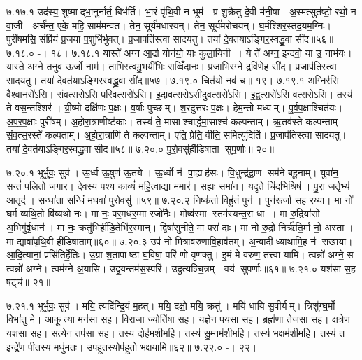 ७.१७.१
उद॑स्य॒ शुष्माद्भा॒नुर्नार्त॒ बिभ॑र्ति। भा॒रं पृ॑थि॒वी न भूम॑। प्र शु॒क्रैतु॑ दे॒वी म॑नी॒षा। अ॒स्मत्सुत॑ष्टो॒ रथो॒ न वा॒जी। अर्च॑न्त॒ एके॒ महि॒ साम॑मन्वत। तेन॒ सूर्य॑मधारयन्। तेन॒ सूर्य॑मरोचयन्। घ॒र्मश्शिर॒स्तद॒यम॒ग्निः। पुरी॑षमसि॒ संप्रि॑यं प्र॒जया॑ प॒शुभि॑र्भुवत्। प्र॒जापति॑स्त्वा सादयतु। तया॑ दे॒वत॑याऽङ्गिर॒स्वद्ध्रु॒वा सी॑द॥५६॥
७.१८.०
-। १८।
\anuvakamend
७.१८.१
यास्ते॑ अग्न आ॒र्द्रा योन॑यो॒ याः कु॑ला॒यिनी। ये ते॑ अग्न॒ इन्द॑वो॒ या उ॒ नाभ॑यः। यास्ते॑ अग्ने त॒नुव॒ ऊर्जो॒ नाम॑। ताभि॒स्त्वमु॒भयी॑भिः सव्विँदा॒नः। प्र॒जाभि॑रग्ने॒ द्रवि॑णे॒ह सी॑द। प्र॒जाप॑तिस्त्वा सादयतु। तया॑ दे॒वत॑याऽङ्गिर॒स्वद्ध्रु॒वा सी॑द॥५७॥
७.१९.०
चित॑यो॒ नव॑ च॥ १९।
\anuvakamend
७.१९.१
अ॒ग्निर॑सि वैश्वान॒रो॑ऽसि। सं॒व॒त्स॒रो॑ऽसि परिवत्स॒रो॑ऽसि। इ॒दा॒व॒त्स॒रो॑ऽसीदुवत्स॒रो॑ऽसि। इ॒द्व॒त्स॒रो॑ऽसि वत्स॒रो॑ऽसि। तस्य॑ ते वस॒न्तश्शिर॑। ग्री॒ष्मो दक्षि॑णः प॒क्षः। व॒र्\mbox{}षाः पुच्छम्। श॒रदुत्त॑रः प॒क्षः। हे॒म॒न्तो मध्यम्। पू॒र्व॒प॒क्षाश्चित॑यः। अ॒प॒र॒प॒क्षाः पुरी॑षम्। अ॒हो॒रा॒त्राणीष्ट॑काः। तस्य॑ ते॒ मासाश्चार्द्धमा॒साश्च॑ कल्पन्ताम्। ऋ॒तव॑स्ते कल्पन्ताम्। सं॒व॒त्स॒रस्ते॑ कल्पताम्। अ॒हो॒रा॒त्राणि॑ ते कल्पन्ताम्। एति॒ प्रेति॒ वीति॒ समित्युदिति॑। प्र॒जाप॑तिस्त्वा सादयतु। तया॑ दे॒वत॑याऽङ्गिर॒स्वद्ध्रु॒वा सी॑द॥५८॥
७.२०.०
पु॒रो॒वसु॑र्\mbox{}हीडिषाता सुप॒र्णाः॥ २०॥
\anuvakamend

७.२०.१
भूर्भुवः॒ सुव॑। ऊ॒र्ध्व ऊ॒षुण॑ ऊ॒तये। ऊ॒र्ध्वो न॑ पा॒ह्यह॑सः। वि॒धुन्द्र॑द्रा॒ण सम॑ने बहू॒नाम्। युवा॑न॒ सन्तं॑ पलि॒तो ज॑गार। दे॒वस्य॑ पश्य॒ काव्यं॑ महि॒त्वाद्या म॒मार॑। सह्यः॒ समा॑न। यदृ॒ते चि॑दभि॒श्रिष॑। पु॒रा ज॒र्तृभ्य॑ आ॒तृद॑। सन्धा॑ता स॒न्धिं म॒घवा॑ पुरो॒वसु॑॥५९॥
७.२०.२
निष्क॑र्ता॒ विह्रु॑तं॒ पुन॑। पुन॑रू॒र्जा स॒ह र॒य्या। मा नो॑ घर्म व्यथि॒तो वि॑व्यथो नः। मा नः॒ पर॒मध॑र॒म्मा रजो॑नैः। मोष्व॑स्मा स्तम॑स्यन्त॒रा धा। मा रु॒द्रिया॑सो अ॒भिगु॑र्वृ॒धान॑। मा नः॒ क्रतु॑भिर्\mbox{}हीडि॒तेभि॑र॒स्मान्। द्विषा॑सुनीते॒ मा परा॑ दाः। मा नो॑ रु॒द्रो निर्\mbox{}ऋ॑ति॒र्मा नो॒ अस्ता। मा द्यावा॑पृथि॒वी ही॑डिषाताम्॥६०॥
७.२०.३
उप॑ नो मित्रावरुणावि॒हाव॑तम्। अ॒न्वादीध्याथामि॒ह न॑ सखाया। आ॒दि॒त्यानां॒ प्रसि॑तिर्\mbox{}हे॒तिः। उ॒ग्रा श॒तापाष्ठा घ॒विषा॒ परि॑ णो वृणक्तु। इ॒मं मे॑ वरुण॒ तत्त्वा॑ यामि। त्वन्नो॑ अग्ने॒ स त्वन्नो॑ अग्ने। त्वम॑ग्ने अ॒यासि॑। उद्व॒यन्तम॑स॒स्परि॑। उदु॒त्यञ्चि॒त्रम्। वय॑ सुपर्णाः॥६१॥
७.२१.०
यश॑सा स॒ह षट्च॑॥ २१॥
\anuvakamend

७.२१.१
भूर्भुवः॒ सुव॑। मयि॒ त्यदि॑न्द्रि॒यं म॒हत्। मयि॒ दक्षो॒ मयि॒ क्रतु॑। मयि॑ धायि सु॒वीर्यम्। त्रिशु॑ग्घ॒र्मो विभा॑तु मे। आकूत्या॒ मन॑सा स॒ह। वि॒राजा॒ ज्योति॑षा स॒ह। य॒ज्ञेन॒ पय॑सा स॒ह। ब्रह्म॑णा॒ तेज॑सा स॒ह। क्ष॒त्रेण॒ यश॑सा स॒ह। स॒त्येन॒ तप॑सा स॒ह। तस्य॒ दोह॑मशीमहि। तस्य॑ सु॒म्नम॑शीमहि। तस्य॑ भ॒क्षम॑शीमहि। तस्य॑ त॒ इन्द्रे॑ण पी॒तस्य॒ मधु॑मतः। उप॑हूत॒स्योप॑हूतो भक्षयामि॥६२॥
७.२२.०
-। २२।
\anuvakamend


